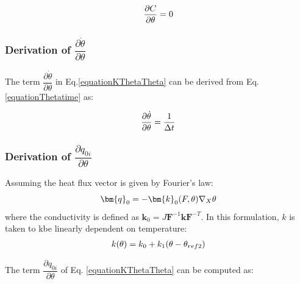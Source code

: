 \documentclass[oneside,11pt,times]{book}
\begin{document}
\begin{equation}
\begin{aligned}
\centering
\dfrac{\partial{C}}{\partial{\theta}}=0
\end{aligned}
\end{equation}

\subsubsection{Derivation of $\dfrac{\partial{\dot{\theta}}}{\partial{\theta}}$}

The term $\dfrac{\partial{\dot{\theta}}}{\partial{\theta}}$ in Eq.\eqref{equationKThetaTheta} can be derived from Eq.\eqref{equationThetatime} as:

\begin{equation}
\begin{aligned}
\centering
\dfrac{\partial{\dot{\theta}}}{\partial{\theta}}=\dfrac{1}{\Delta t}
\end{aligned}
\end{equation}

\subsubsection{Derivation of $\dfrac{\partial q_{0i}}{\partial\theta}$}
Assuming the heat flux vector is given by Fourier's law:
\begin{equation}
\centering
\bm{q}_0=-\bm{k}_0(F,\theta)\nabla_{X}\theta
\label{Fourier}
\end{equation}
where the conductivity is defined as  $\bm{k}_0=J\bm{F}^{-1}\bm{k}\bm{F}^{-T}$.
In this formulation, $k$ is taken to kbe linearly dependent on temperature:
\begin{equation}
\begin{aligned}
\centering
k(\theta)=k_0+k_1(\theta-\theta_{ref2})
\end{aligned}
\label{conductivitytemp}
\end{equation}

The term $\dfrac{\partial q_{0i}}{\partial\theta}$ of Eq. \eqref{equationKThetaTheta} can be computed as:

\end{document}
